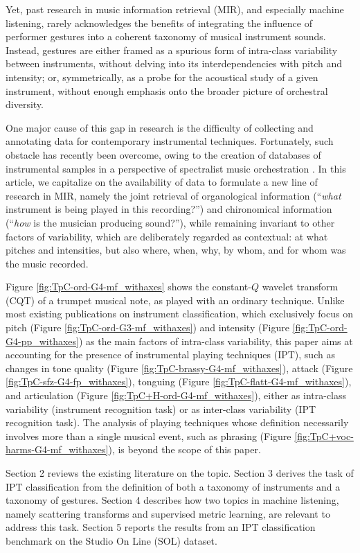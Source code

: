 \documentclass{article}
\begin{document}
Yet, past research in music information retrieval (MIR), and especially machine listening, rarely acknowledges the benefits of integrating the influence of performer gestures into a coherent taxonomy of musical instrument sounds.
Instead, gestures are either framed as a spurious form of intra-class variability between instruments, without delving into its interdependencies with pitch and intensity;
or, symmetrically, as a probe for the acoustical study of a given instrument, without enough emphasis onto the broader picture of orchestral diversity.

One major cause of this gap in research is the difficulty of collecting and annotating data for contemporary instrumental techniques.
Fortunately, such obstacle has recently been overcome, owing to the creation of databases of instrumental samples in a perspective of spectralist music orchestration \cite{maresz2013cmr}.
In this article, we capitalize on the availability of data to formulate a new line of research in MIR, namely the joint retrieval of organological information (``\emph{what} instrument is being played in this recording?'') and chironomical information (``\emph{how} is the musician producing sound?''), while remaining invariant to other factors of variability, which are deliberately regarded as contextual: at what pitches and intensities, but also where, when, why, by whom, and for whom was the music recorded.

Figure \ref{fig:TpC-ord-G4-mf_withaxes} shows the constant-$Q$ wavelet transform (CQT) of a trumpet musical note, as played with an ordinary technique.
Unlike most existing publications on instrument classification, which exclusively focus on pitch (Figure \ref{fig:TpC-ord-G3-mf_withaxes}) and intensity (Figure \ref{fig:TpC-ord-G4-pp_withaxes}) as the main factors of intra-class variability, this paper aims at accounting for the presence of instrumental playing techniques (IPT), such as changes in tone quality (Figure \ref{fig:TpC-brassy-G4-mf_withaxes}), attack (Figure \ref{fig:TpC-sfz-G4-fp_withaxes}), tonguing (Figure \ref{fig:TpC-flatt-G4-mf_withaxes}), and articulation (Figure \ref{fig:TpC+H-ord-G4-mf_withaxes}), either as intra-class variability (instrument recognition task) or as inter-class variability (IPT recognition task).
The analysis of playing techniques whose definition necessarily involves more than a single musical event, such as phrasing (Figure \ref{fig:TpC+voc-harms-G4-mf_withaxes}), is beyond the scope of this paper.


Section 2 reviews the existing literature on the topic.
Section 3 derives the task of IPT classification from the definition of both a taxonomy of instruments and a taxonomy of gestures.
Section 4 describes how two topics in machine listening, namely scattering transforms and supervised metric learning, are relevant to address this task.
Section 5 reports the results from an IPT classification benchmark on the Studio On Line (SOL) dataset.
\end{document}
